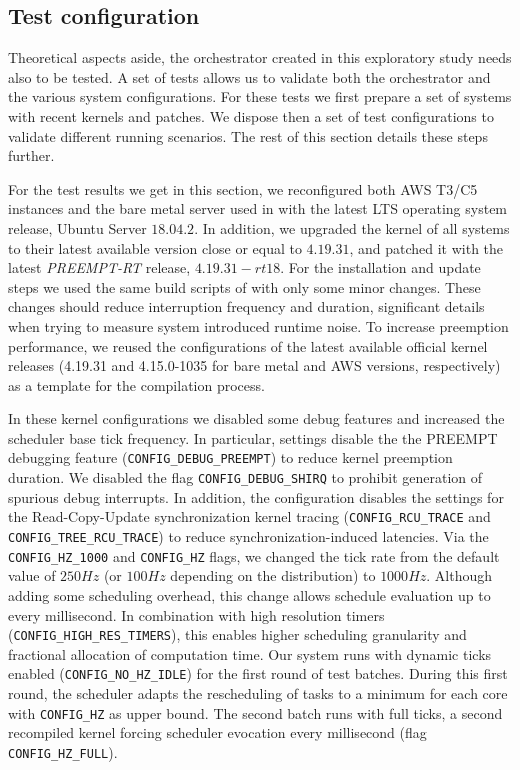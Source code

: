 \documentclass[]{scrartcl}
\begin{document}
\subsection{Test configuration}
\label{sub:testcfg}

Theoretical aspects aside, the orchestrator created in this exploratory study needs also to be tested.
A set of tests allows us to validate both the orchestrator and the various system configurations.
For these tests we first prepare a set of systems with recent kernels and patches.
We dispose then a set of test configurations to validate different running scenarios. 
The rest of this section details these steps further.

For the test results we get in this section, we reconfigured both AWS T3/C5 instances and the bare metal server used in \cite{Hoferetal2019} with the latest LTS operating system release, Ubuntu Server $18.04.2$.
In addition, we upgraded the kernel of all systems to their latest available version close or equal to $4.19.31$, and patched it with the latest \emph{PREEMPT-RT} release, $4.19.31-rt18$.
For the installation and update steps we used the same build scripts of \cite{Hoferetal2019} with only some minor changes.
These changes should reduce interruption frequency and duration, significant details when trying to measure system introduced runtime noise.
To increase preemption performance, we reused the configurations of the latest available official kernel releases (4.19.31 and 4.15.0-1035 for bare metal and AWS versions, respectively) as a template for the compilation process.

In these kernel configurations we disabled some debug features and increased the scheduler base tick frequency.
In particular, settings disable the the PREEMPT debugging feature (\texttt{CONFIG\_DEBUG\_PREEMPT}) to reduce kernel preemption duration.
We disabled the flag \texttt{CONFIG\_DEBUG\_SHIRQ} to prohibit generation of spurious debug interrupts.
In addition, the configuration disables the settings for the Read-Copy-Update synchronization kernel tracing  (\texttt{CONFIG\_RCU\_TRACE} and \texttt{CONFIG\_TREE\_RCU\_TRACE}) to reduce synchronization-induced latencies.
Via the \texttt{CONFIG\_HZ\_1000} and \texttt{CONFIG\_HZ} flags, we changed the tick rate from the default value of $250Hz$ (or $100Hz$ depending on the distribution) to $1000Hz$.
Although adding some scheduling overhead, this change allows schedule evaluation up to every millisecond. 
In combination with high resolution timers (\texttt{CONFIG\_HIGH\_RES\_TIMERS}), this enables higher scheduling granularity and fractional allocation of computation time.
Our system runs with dynamic ticks enabled (\texttt{CONFIG\_NO\_HZ\_IDLE}) for the first round of test batches.
During this first round, the scheduler adapts the rescheduling of tasks to a minimum for each core with \texttt{CONFIG\_HZ} as upper bound. 
The second batch runs with full ticks, a second recompiled kernel forcing scheduler evocation every millisecond (flag \texttt{CONFIG\_HZ\_FULL}).
\end{document}
